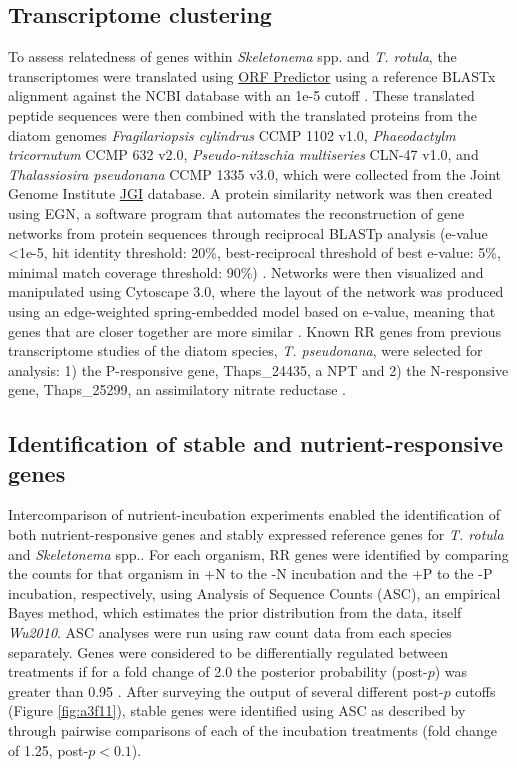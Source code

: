 \subsection{Transcriptome clustering}
To assess relatedness of genes within \textit{Skeletonema} spp. and \textit{T. rotula}, the transcriptomes were translated using \href{http://proteomics.ysu.edu/tools/OrfPredictor.html}{ORF Predictor} using a reference BLASTx alignment against the NCBI database with an 1e-5 cutoff \citep{Min2005}. These translated peptide sequences were then combined with the translated proteins from the diatom genomes \textit{Fragilariopsis cylindrus} CCMP 1102 v1.0, \textit{Phaeodactylm tricornutum} CCMP 632 v2.0, \textit{Pseudo-nitzschia multiseries} CLN-47 v1.0, and \textit{Thalassiosira pseudonana} CCMP 1335 v3.0, which were collected from the Joint Genome Institute \href{http://genome.jgi-psf.org}{JGI} database. A protein similarity network was then created using EGN, a software program that automates the reconstruction of gene networks from protein sequences through reciprocal BLASTp analysis (e-value <1e-5, hit identity threshold: 20\%, best-reciprocal threshold of best e-value: 5\%, minimal match coverage threshold: 90\%) \citep{Halary2013, Halary2010}. Networks were then visualized and manipulated using Cytoscape 3.0, where the layout of the network was produced using an edge-weighted spring-embedded model based on e-value, meaning that genes that are closer together are more similar \citep{Smoot2011, Saito2012}. Known RR genes from previous transcriptome studies of the diatom species, \textit{T. pseudonana}, were selected for analysis: 1) the P-responsive gene, Thaps\_24435, a NPT \citep{Dyhrman2012} and 2) the N-responsive gene, Thaps\_25299, an assimilatory nitrate reductase \citep{Bender2014}. 
\subsection{Identification of stable and nutrient-responsive genes}
Intercomparison of nutrient-incubation experiments enabled the identification of both nutrient-responsive genes and stably expressed reference genes for \textit{T. rotula} and \textit{Skeletonema} spp.. For each organism, RR genes were identified by comparing the counts for that organism in +N to the -N incubation and the +P to the -P incubation, respectively, using Analysis of Sequence Counts (ASC), an empirical Bayes method, which estimates the prior distribution from the data, itself \textit{Wu2010}. ASC analyses were run using raw count data from each species separately. Genes were considered to be differentially regulated between treatments if for a fold change of 2.0 the posterior probability (post-$p$) was greater than 0.95 \citep{Dyhrman2012}. After surveying the output of several different post-$p$ cutoffs (Figure \ref{fig:a3f11}), stable genes were identified using ASC as described by \citet{Alexander2012} through pairwise comparisons of each of the incubation treatments (fold change of 1.25, post-$p < 0.1$). 
